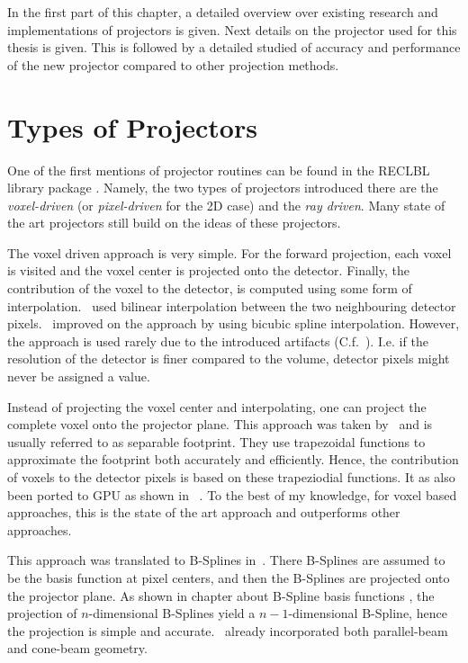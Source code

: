 In the first part of this chapter, a detailed overview over existing research and implementations of
projectors is given. Next details on the projector used for this thesis is given. This is followed
by a detailed studied of accuracy and performance of the new projector compared to other projection
methods.

\section{Types of Projectors}\label{sec:projector_types}

One of the first mentions of projector routines can be found in the RECLBL library package
. Namely, the two types of projectors introduced there are the
\textit{voxel-driven} (or \textit{pixel-driven} for the 2D case) and the \textit{ray driven}. Many
state of the art projectors still build on the ideas of these projectors.

The voxel driven approach is very simple. For the forward projection, each voxel is visited and the
voxel center is projected onto the detector. Finally, the contribution of the voxel to the detector,
is computed using some form of interpolation.~\cite{peters_algorithms_1981} used bilinear
interpolation between the two neighbouring detector pixels.~\cite{harauz_interpolation_1983}
improved on the approach by using bicubic spline interpolation. However, the approach is used rarely
due to the introduced artifacts (C.f.~\cite[Chapter 3.3]{levakhina_three-dimensional_2014}). I.e. if
the resolution of the detector is finer compared to the volume, detector pixels might never be
assigned a value. 

Instead of projecting the voxel center and interpolating, one can project the complete voxel onto
the projector plane. This approach was taken by~\cite{long_3d_2010, long_3d_nodate} and is usually
referred to as separable footprint. They use trapezoidal functions to approximate the footprint both
accurately and efficiently. Hence, the contribution of voxels to the detector pixels is based on
these trapeziodial functions. It as also been ported to \gls{GPU} as shown in ~\cite{wu_gpu_2011,
	xie_effective_2015, chapdelaine_new_nodate}. To the best of my knowledge, for voxel based
approaches, this is the state of the art approach and outperforms other approaches.

This approach was translated to B-Splines in~\cite{momey_b-spline_2012, momey_spline_2015}. There
B-Splines are assumed to be the basis function at pixel centers, and then the B-Splines are
projected onto the projector plane. As shown in chapter about B-Spline basis functions
, the projection of \(n\)-dimensional B-Splines yield a
\(n-1\)-dimensional B-Spline, hence the projection is simple and
accurate.~\cite{momey_b-spline_2012} already incorporated both parallel-beam and cone-beam
geometry.

